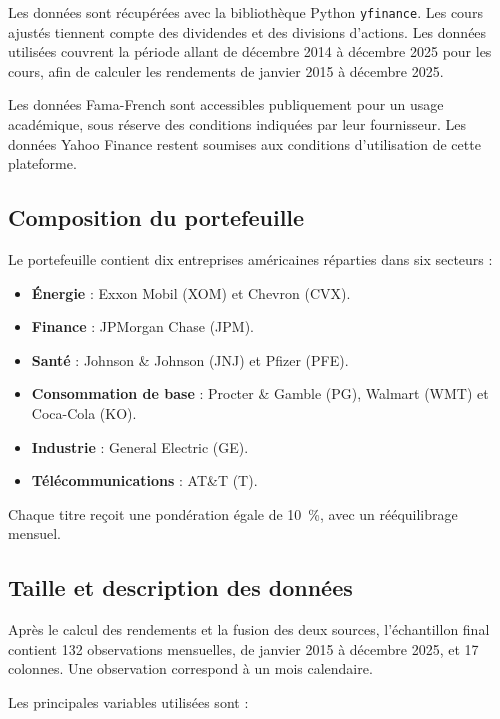 \documentclass[12pt,a4paper]{article}
\begin{document}
Les données sont récupérées avec la bibliothèque Python \texttt{yfinance}. Les cours ajustés tiennent compte des dividendes et des divisions d'actions. Les données utilisées couvrent la période allant de décembre 2014 à décembre 2025 pour les cours, afin de calculer les rendements de janvier 2015 à décembre 2025.

Les données Fama-French sont accessibles publiquement pour un usage académique, sous réserve des conditions indiquées par leur fournisseur. Les données Yahoo Finance restent soumises aux conditions d'utilisation de cette plateforme.

\subsection{Composition du portefeuille}

Le portefeuille contient dix entreprises américaines réparties dans six secteurs :
\begin{itemize}
    \item \textbf{Énergie} : Exxon Mobil (XOM) et Chevron (CVX).
    \item \textbf{Finance} : JPMorgan Chase (JPM).
    \item \textbf{Santé} : Johnson \& Johnson (JNJ) et Pfizer (PFE).
    \item \textbf{Consommation de base} : Procter \& Gamble (PG), Walmart (WMT) et Coca-Cola (KO).
    \item \textbf{Industrie} : General Electric (GE).
    \item \textbf{Télécommunications} : AT\&T (T).
\end{itemize}

Chaque titre reçoit une pondération égale de 10~\%, avec un rééquilibrage mensuel.

\subsection{Taille et description des données}

Après le calcul des rendements et la fusion des deux sources, l'échantillon final contient 132 observations mensuelles, de janvier 2015 à décembre 2025, et 17 colonnes. Une observation correspond à un mois calendaire.

Les principales variables utilisées sont :
\end{document}
